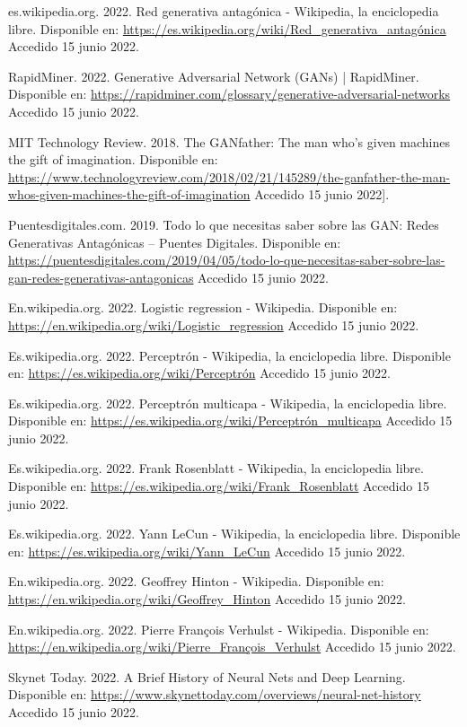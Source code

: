 \documentclass[a4paper]{article}
\begin{document}
\begin{thebibliography}{9}


es.wikipedia.org. 2022. Red generativa antagónica - Wikipedia, la enciclopedia libre. Disponible en: \url{https://es.wikipedia.org/wiki/Red_generativa_antagónica} Accedido 15 junio 2022.

RapidMiner. 2022. Generative Adversarial Network (GANs) | RapidMiner. Disponible en: \url{https://rapidminer.com/glossary/generative-adversarial-networks} Accedido 15 junio 2022.

MIT Technology Review. 2018. The GANfather: The man who’s given machines the gift of imagination. Disponible en: \url{https://www.technologyreview.com/2018/02/21/145289/the-ganfather-the-man-whos-given-machines-the-gift-of-imagination} Accedido 15 junio 2022].

Puentesdigitales.com. 2019. Todo lo que necesitas saber sobre las GAN: Redes Generativas Antagónicas – Puentes Digitales. Disponible en: \url{https://puentesdigitales.com/2019/04/05/todo-lo-que-necesitas-saber-sobre-las-gan-redes-generativas-antagonicas} Accedido 15 junio 2022.

En.wikipedia.org. 2022. Logistic regression - Wikipedia. Disponible en: \url{https://en.wikipedia.org/wiki/Logistic_regression} Accedido 15 junio 2022.

Es.wikipedia.org. 2022. Perceptrón - Wikipedia, la enciclopedia libre. Disponible en: \url{https://es.wikipedia.org/wiki/Perceptrón} Accedido 15 junio 2022.

Es.wikipedia.org. 2022. Perceptrón multicapa - Wikipedia, la enciclopedia libre. Disponible en: \url{https://es.wikipedia.org/wiki/Perceptrón_multicapa} Accedido 15 junio 2022.

Es.wikipedia.org. 2022. Frank Rosenblatt - Wikipedia, la enciclopedia libre. Disponible en: \url{https://es.wikipedia.org/wiki/Frank_Rosenblatt} Accedido 15 junio 2022.

Es.wikipedia.org. 2022. Yann LeCun - Wikipedia, la enciclopedia libre. Disponible en: \url{https://es.wikipedia.org/wiki/Yann_LeCun} Accedido 15 junio 2022.

En.wikipedia.org. 2022. Geoffrey Hinton - Wikipedia. Disponible en: \url{https://en.wikipedia.org/wiki/Geoffrey_Hinton} Accedido 15 junio 2022.

En.wikipedia.org. 2022. Pierre François Verhulst - Wikipedia. Disponible en: \url{https://en.wikipedia.org/wiki/Pierre_François_Verhulst} Accedido 15 junio 2022.

Skynet Today. 2022. A Brief History of Neural Nets and Deep Learning. Disponible en: \url{https://www.skynettoday.com/overviews/neural-net-history} Accedido 15 junio 2022.

\end{thebibliography}
\newpage
\tableofcontents
\end{document}
